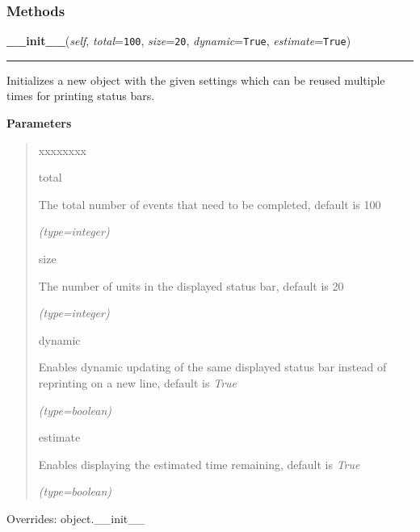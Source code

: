 
  \subsubsection{Methods}

    \vspace{0.5ex}

\hspace{.8\funcindent}\begin{boxedminipage}{\funcwidth}

    \raggedright \textbf{\_\_init\_\_}(\textit{self}, \textit{total}={\tt 100}, \textit{size}={\tt 20}, \textit{dynamic}={\tt True}, \textit{estimate}={\tt True})

    \vspace{-1.5ex}

    \rule{\textwidth}{0.5\fboxrule}
\setlength{\parskip}{2ex}
    Initializes a new object with the given settings which can be reused 
    multiple times for printing status bars.

\setlength{\parskip}{1ex}
      \textbf{Parameters}
      \vspace{-1ex}

      \begin{quote}
        \begin{Ventry}{xxxxxxxx}

          \item[total]

          The total number of events that need to be completed, default is 
          100

            {\it (type=integer)}

          \item[size]

          The number of units in the displayed status bar, default is 20

            {\it (type=integer)}

          \item[dynamic]

          Enables dynamic updating of the same displayed status bar instead
          of reprinting on a new line, default is \textit{True}

            {\it (type=boolean)}

          \item[estimate]

          Enables displaying the estimated time remaining, default is 
          \textit{True}

            {\it (type=boolean)}

        \end{Ventry}

      \end{quote}

      Overrides: object.\_\_init\_\_

    \end{boxedminipage}

